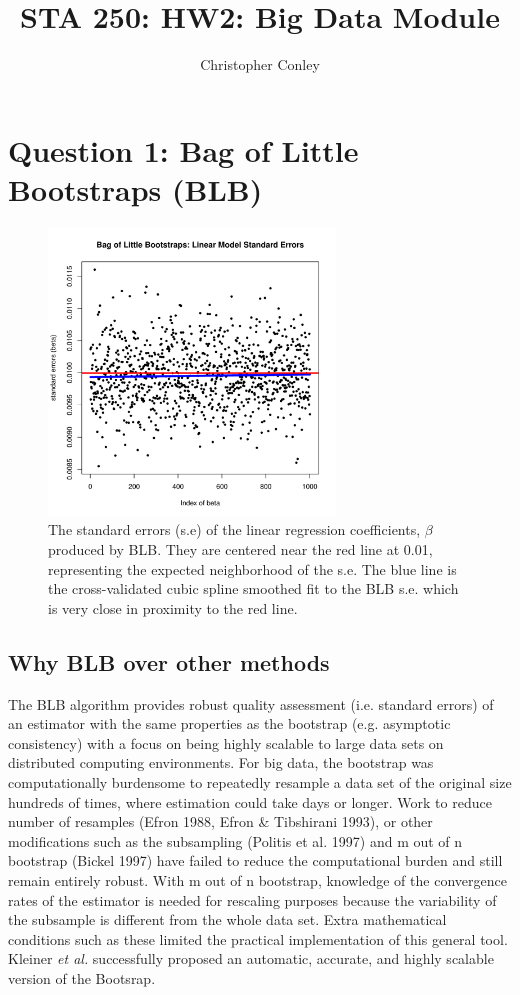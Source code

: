 \documentclass[10pt]{amsart}
\title{STA 250: HW2: Big Data Module}
\author{Christopher Conley}
\date{}                                           %
\begin{document}
\maketitle
\doublespacing
\tableofcontents
\section{Question 1: Bag of Little Bootstraps (BLB) }

\begin{figure}[htbp] %
   \centering
   \includegraphics[width=3in]{../BLB/blb_lin_reg_se.pdf} 
   \caption{The standard errors (s.e)  of the linear regression coefficients, $\beta$ produced by BLB.  They are centered near the red line at 0.01, representing the expected neighborhood of the s.e.  The blue line is the cross-validated cubic spline smoothed fit to the BLB s.e. which is very close in proximity to the red line. }
   \label{fig:blb}
\end{figure}

\subsection{Why BLB over other methods}

The BLB algorithm provides robust quality assessment (i.e. standard errors) of an estimator with the same properties as the bootstrap (e.g.  asymptotic consistency) with a focus on being highly scalable to large data sets on distributed computing environments. For big data, the bootstrap was computationally burdensome to repeatedly resample a data set of the original size hundreds of times, where estimation could take days or longer. Work to reduce number of resamples (Efron 1988, Efron \& Tibshirani 1993), or other modifications such as the subsampling (Politis et al. 1997) and m out of n bootstrap (Bickel 1997) have failed to reduce the computational burden and still remain entirely robust. With m out of n bootstrap, knowledge of the convergence rates of the estimator is needed for rescaling purposes because the variability of the subsample is different from the whole data set. Extra mathematical conditions such as these limited the practical implementation of this general tool. Kleiner \emph{et al.} successfully proposed an automatic, accurate, and highly scalable version of the Bootsrap. 
\end{document}
